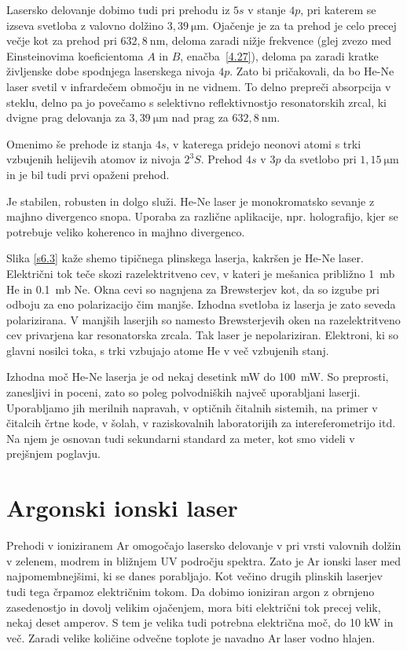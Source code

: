 Lasersko delovanje dobimo tudi pri prehodu iz $5s$ v stanje $4p$, pri katerem 
se izseva svetloba z valovno dolžino $3,39~\si{\micro\metre}$. 
Ojačenje je za ta prehod je celo precej večje kot za
prehod pri $632,8~\si{\nano\metre}$, deloma zaradi nižje frekvence 
(glej zvezo med Einsteinovima koeficientoma $A$ in $B$, enačba~\ref{4.27}), 
deloma pa zaradi kratke življenske dobe spodnjega laserskega nivoja $4p$. 
Zato bi pričakovali, da bo He-Ne laser svetil v infrardečem območju in ne vidnem. 
To delno prepreči absorpcija v steklu, delno pa jo povečamo s selektivno reflektivnostjo
resonatorskih zrcal, ki dvigne prag delovanja za $3,39~\si{\micro\metre}$ 
nad prag za $632,8~\si{\nano\metre}$.

Omenimo še prehode iz stanja $4s$, v katerega pridejo neonovi atomi s trki
vzbujenih helijevih atomov iz nivoja $2^3S$. Prehod $4s$ v $3p$ da svetlobo
pri $1,15~\si{\micro\metre}$ in je bil tudi prvi opaženi prehod. 

Je stabilen, robusten in dolgo služi. He-Ne laser je monokromatsko sevanje z majhno
divergenco snopa. Uporaba za različne aplikacije, npr. holografijo, kjer se potrebuje
veliko koherenco in majhno divergenco. 

Slika \ref{s6.3} kaže shemo tipičnega plinskega laserja, kakršen je He-Ne
laser. Električni tok teče skozi razelektritveno cev, v kateri je
mešanica približno 1~mb He in 0.1~mb Ne. Okna cevi so nagnjena za
Brewsterjev kot, da so izgube pri odboju za eno polarizacijo čim manjše.
Izhodna svetloba iz laserja je zato seveda polarizirana. V manjših laserjih
so namesto Brewsterjevih oken na razelektritveno cev privarjena kar
resonatorska zrcala. Tak laser je nepolariziran. Elektroni, ki so glavni
nosilci toka, s trki vzbujajo atome He v več vzbujenih stanj. 

Izhodna moč He-Ne laserja je od nekaj desetink mW do 100~mW. So preprosti,
zanesljivi in poceni, zato so poleg polvodniških največ uporabljani
laserji. Uporabljamo jih merilnih napravah, v optičnih čitalnih sistemih,
na primer v čitalcih črtne kode, v šolah, v raziskovalnih laboratorijih
za intereferometrijo itd. Na njem je osnovan tudi sekundarni standard za
meter, kot smo videli v prejšnjem poglavju.

\section{Argonski ionski laser}

Prehodi v ioniziranem Ar omogočajo lasersko delovanje v pri vrsti valovnih
dolžin v zelenem, modrem in bližnjem UV področju spektra. Zato je Ar
ionski laser med najpomembnejšimi, ki se danes porabljajo. Kot večino
drugih plinskih laserjev tudi tega črpamoz električnim tokom. Da dobimo
ioniziran argon z obrnjeno zasedenostjo in dovolj velikim ojačenjem, mora
biti električni tok precej velik, nekaj deset amperov. S tem je velika tudi
potrebna električna moč, do 10 kW in več. Zaradi velike količine
odvečne toplote je navadno Ar laser vodno hlajen.

